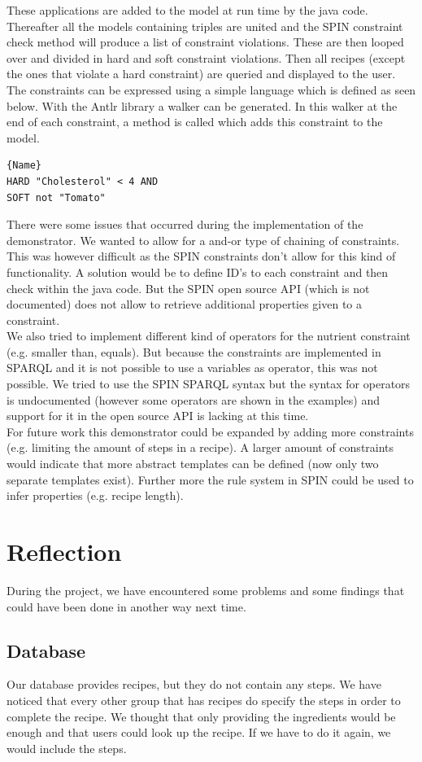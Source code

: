 These applications are added to the model at run time by the java code. Thereafter all the models containing triples are united and the SPIN constraint check method will produce a list of constraint violations. These are then looped over and divided in hard and soft constraint violations. Then all recipes (except the ones that violate a hard constraint) are queried and displayed to the user.\\
The constraints can be expressed using a simple language which is defined as seen below. With the Antlr library a walker can be generated. In this walker at the end of each constraint, a method is called which adds this constraint to the model. 
\begin{lstlisting}[caption=Example of the constraints file]{Name}
HARD "Cholesterol" < 4 AND
SOFT not "Tomato" 
\end{lstlisting}
There were some issues that occurred during the implementation of the demonstrator. We wanted to allow for a and-or type of chaining of constraints. This was however difficult as the SPIN constraints don't allow for this kind of functionality. A solution would be to define ID's to each constraint and then check within the java code. But the SPIN open source API (which is not documented) does not allow to retrieve additional properties given to a constraint.\\
We also tried to implement different kind of operators for the nutrient constraint (e.g. smaller than, equals). But because the constraints are implemented in SPARQL and it is not possible to use a variables as operator, this was not possible. We tried to use the SPIN SPARQL syntax but the syntax for operators is undocumented (however some operators are shown in the examples) and support for it in the open source API is lacking at this time.\\
For future work this demonstrator could be expanded by adding more constraints (e.g. limiting the amount of steps in a recipe). A larger amount of constraints would indicate that more abstract templates can be defined (now only two separate templates exist). Further more the rule system in SPIN could be used to infer properties (e.g. recipe length).

\section{Reflection}
During the project, we have encountered some problems and some findings that could have been done in another way next time. 
\subsection*{Database} 
Our database provides recipes, but they do not contain any steps. We have noticed that every other group that has recipes do specify the steps in order to complete the recipe. We thought that only providing the ingredients would be enough and that users could look up the recipe. If we have to do it again, we would include the steps.
